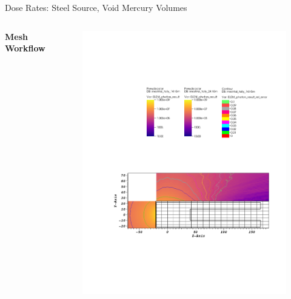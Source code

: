 \documentclass{beamer}
\begin{document}
\begin{frame}{Dose Rates: Steel Source, Void Mercury Volumes}
\begin{columns}[T]
        \textbf{Mesh Workflow}
        \begin{figure}
                \centering
                \includegraphics[scale=0.49,trim={2.5cm 6cm 1cm 15cm},clip]{figs/dose_steel_mesh_void.pdf}
        \end{figure}


\end{columns}
\end{frame}
\end{document}

